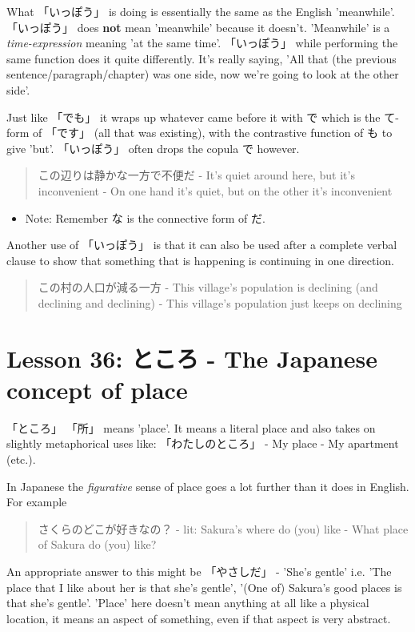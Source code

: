 \documentclass[11pt]{article}
\begin{document}
What 「いっぽう」 is doing is essentially the same as the English 'meanwhile'. 「いっぽう」 does \textbf{not} mean 'meanwhile' because it doesn't. 'Meanwhile' is a \emph{time-expression} meaning 'at the same time'. 「いっぽう」 while performing the same function does it quite differently. It's really saying, 'All that (the previous sentence/paragraph/chapter) was one side, now we're going to look at the other side'.

Just like 「でも」 it wraps up whatever came before it with で which is the て-form of 「です」 (all that was existing), with the contrastive function of も to give 'but'. 「いっぽう」 often drops the copula で however.

\begin{quote}
この辺りは静かな一方で不便だ - It's quiet around here, but it's inconvenient - On one hand it's quiet, but on the other it's inconvenient
\end{quote}
\begin{itemize}
\item Note: Remember な is the connective form of だ.
\end{itemize}

Another use of 「いっぽう」 is that it can also be used after a complete verbal clause to show that something that is happening is continuing in one direction.
\begin{quote}
この村の人口が減る一方 - This village's population is declining (and declining and declining) - This village's population just keeps on declining
\end{quote}

\section{Lesson 36: ところ - The Japanese concept of place}
\label{sec:orgd3a84d2}
「ところ」 「所」 means 'place'. It means a literal place and also takes on slightly metaphorical uses like: 「わたしのところ」 - My place - My apartment (etc.).

In Japanese the \emph{figurative} sense of place goes a lot further than it does in English. For example
\begin{quote}
さくらのどこが好きなの？ - lit: Sakura's where do (you) like - What place of Sakura do (you) like?
\end{quote}
An appropriate answer to this might be 「やさしだ」 - 'She's gentle' i.e. 'The place that I like about her is that she's gentle', '(One of) Sakura's good places is that she's gentle'. 'Place' here doesn't mean anything at all like a physical location, it means an aspect of something, even if that aspect is very abstract.
\end{document}
